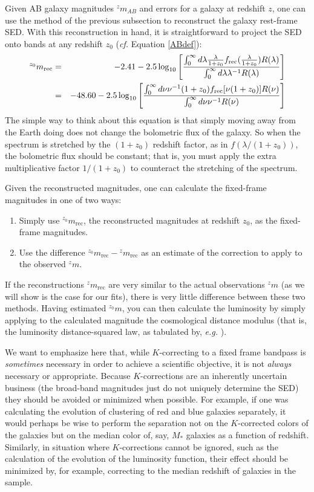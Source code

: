 \documentclass[10pt,preprint]{aastex}
\newcommand{\band}[2]{\ensuremath{^{#1}\!{#2}}}
\begin{document}
Given AB galaxy magnitudes $^{z}m_{AB}$ and errors for a galaxy at
redshift $z$, one can use the method of the previous subsection to
reconstruct the galaxy rest-frame SED.  With this reconstruction in
hand, it is straightforward to project the SED onto bands at any
redshift $z_0$ ({\it cf.} Equation \ref{ABdef}):
\begin{eqnarray}
^{z_0}m_{\mathrm{rec}} &=& -2.41 - 2.5 \log_{10}\left[
\frac{\int_{0}^{\infty} d\lambda \frac{\lambda}{1+z_0}
f_{\mathrm{rec}}(\frac{\lambda}{1+z_0}) R(\lambda)}
{\int_{0}^{\infty} d\lambda \lambda^{-1} R(\lambda)}\right] \cr
&=& -48.60 - 2.5 \log_{10}\left[
\frac{\int_{0}^{\infty} d\nu \nu^{-1} (1+z_0)
f_{\mathrm{rec}}[\nu (1+z_0)] R(\nu)}
{\int_{0}^{\infty} d\nu \nu^{-1} R(\nu)}\right] 
\end{eqnarray}
The simple way to think about this equation is that simply moving away
from the Earth doing does not change the bolometric flux of the
galaxy. So when the spectrum is stretched by the $(1+z_0)$ redshift
factor, as in $f(\lambda/(1+z_0))$, the bolometric flux should be
constant; that is, you must apply the extra multiplicative factor
$1/(1+z_0)$ to counteract the stretching of the spectrum. 

Given the reconstructed magnitudes, one can calculate the fixed-frame
magnitudes in one of two ways:
\begin{enumerate}
\item Simply use $\band{z_0}{m_{\mathrm{rec}}}$, the reconstructed
magnitudes at redshift $z_0$, as the fixed-frame magnitudes.
\item Use the difference
$\band{z_0}{m_{\mathrm{rec}}}-\band{z}{m_{\mathrm{rec}}}$ as an
estimate of the correction to apply to the observed $\band{z}{m}$.
\end{enumerate}
If the reconstructions $\band{z}{m_{\mathrm{rec}}}$ are very similar
to the actual observations $\band{z}{m}$ (as we will show is the case
for our fits), there is very little difference between these two
methods. Having estimated $\band{z_0}{m}$, you can then calculate the
luminosity by simply applying to the calculated magnitude the
cosmological distance modulus (that is, the luminosity
distance-squared law, as tabulated by, {\it e.g.}  \citealt{hogg99a}).

We want to emphasize here that, while $K$-correcting to a fixed frame
bandpass is {\it sometimes} necessary in order to achieve a scientific
objective, it is not {\it always} necessary or appropriate. Because
$K$-corrections are an inherently uncertain business (the broad-band
magnitudes just do not uniquely determine the SED) they should be
avoided or minimized when possible. For example, if one was calculating
the evolution of clustering of red and blue galaxies separately, it
would perhaps be wise to perform the separation not on the
$K$-corrected colors of the galaxies but on the median color of, say,
$M_\ast$ galaxies as a function of redshift. Similarly, in situation
where $K$-corrections cannot be ignored, such as the calculation of
the evolution of the luminosity function, their effect should be
minimized by, for example, correcting to the median redshift of
galaxies in the sample.
\end{document}
